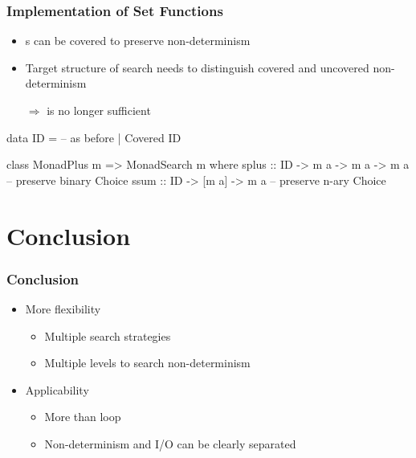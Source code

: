 \documentclass[%
,hyperref={pdfpagelabels=false}
,utf8
]{beamer}
\newcommand{\ergo}{$\Rightarrow$}
\begin{document}
\begin{frame}[fragile]%
\frametitle{Implementation of Set Functions}

\begin{itemize}
  \item {}s can be covered to preserve non-determinism
  \item Target structure of search needs to distinguish covered and uncovered
        non-determinism
  \item[\ergo]  is no longer sufficient
\end{itemize}

\begin{haskell}
data ID = -- as before
        | Covered ID
\end{haskell}

\begin{haskell}
class MonadPlus m => MonadSearch m where
  splus :: ID -> m a -> m a -> m a -- preserve binary Choice
  ssum  :: ID -> [m a] -> m a      -- preserve n-ary  Choice
\end{haskell}

\end{frame}


\section{Conclusion}

\begin{frame}[fragile]%
\frametitle{Conclusion}

\begin{itemize}
\item More flexibility
      \begin{itemize}
        \item Multiple search strategies
        \item Multiple levels to search non-determinism
      \end{itemize}
\item Applicability
      \begin{itemize}
        \item More than  loop
        \item Non-determinism and I/O can be clearly separated
      \end{itemize}
\end{itemize}
\end{frame}
\end{document}
